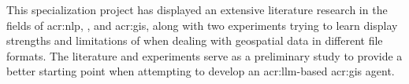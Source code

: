 \begin{comment}
What are the main contributions made to the field?
How significant are these contributions?
Also discuss the contributions in terms of the goals and research questions formulated in the Introduction.

The contributions section will normally contain everything that you address in the abstract, but in an extended form and quite possibly additional issues that cannot be included in the abstract.
An obvious difference is that when the reader has come this far in the text, she/he should be quite familiar with the work, but while reading the abstract they will have little to no knowledge of the work.

The section ``Contributions'' in Chapter~\ref{cha:introduction} differs from this one in that the former is just a list of the main bits, while this section should explain them in more detail.
However, basically the same items should appear in both sections.

\section{Future Work}
\label{sec:futureWork}

Consider where you would like to extend or improve this work, or how somebody else could continue it.
These extensions might either be continuing the ongoing direction or taking a side direction that became obvious during the work.
Further, possible solutions to limitations in the work conducted, highlighted in Section~\ref{sec:discussion} may be presented.

Note that in the Specialisation Project Report, the Future Work section will be a key part of your plan for the novel work to be carried out in the next semester,
while in the Master's Thesis, the Future Work section rather will point to issues that others might be interested in addressing.
This can include options and alternatives that you did not try out yourself, or potential improvements and extensions to your experiments or system.
\end{comment}

This specialization project has displayed an extensive literature research in the fields of \acrlong{acr:nlp}, , and \acrlong{acr:gis}, along with two experiments trying to learn display strengths and limitations of  when dealing with geospatial data in different file formats. The literature and experiments serve as a preliminary study to provide a better starting point when attempting to develop an \acrshort{acr:llm}-based \acrshort{acr:gis} agent.

